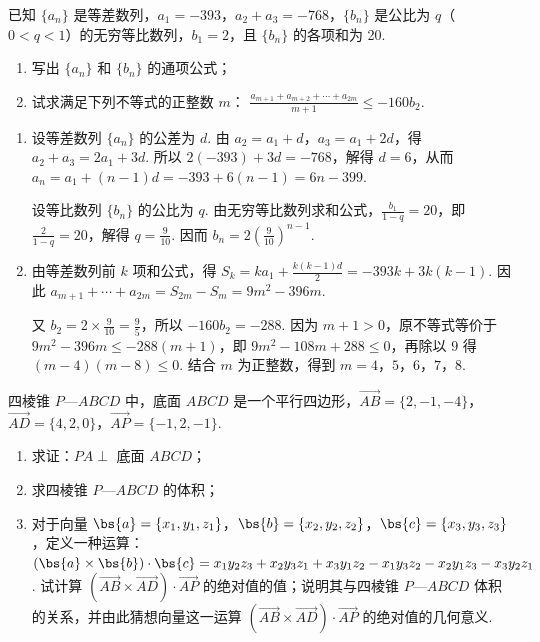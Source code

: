 \begin{problem}
已知 \(\{a_{n}\}\) 是等差数列，\(a_{1} = -393\)，\(a_{2} + a_{3} = -768\)，\(\{b_{n}\}\) 是公比为 \(q\)（\(0 < q < 1\)）的无穷等比数列，\(b_{1} = 2\)，且 \(\{b_{n}\}\) 的各项和为 20.

\begin{enumerate}
\item 写出 \(\{a_{n}\}\) 和 \(\{b_{n}\}\) 的通项公式；
\item 试求满足下列不等式的正整数 \(m\)： \(\displaystyle \frac{a_{m + 1} + a_{m + 2} + \cdots + a_{2m}}{m + 1} \leqslant -160b_{2}\).
\end{enumerate}
\end{problem}

\begin{solution}
\begin{enumerate}
\item 设等差数列 \(\{a_n\}\) 的公差为 \(d\). 由 \(a_2=a_1+d\)，\(a_3=a_1+2d\)，得
\(a_2+a_3=2a_1+3d\). 所以 \(2(-393)+3d=-768\)，解得 \(d=6\)，从而
\(a_n=a_1+(n-1)d=-393+6(n-1)=6n-399\).

设等比数列 \(\{b_n\}\) 的公比为 \(q\). 由无穷等比数列求和公式，\(\frac{b_1}{1-q}=20\)，即 \(\frac2{1-q}=20\)，解得 \(q=\frac9{10}\). 因而
\(b_n=2\left(\frac9{10}\right)^{n-1}\).

\item 由等差数列前 \(k\) 项和公式，得
\(S_k=ka_1+\frac{k(k-1)d}{2}=-393k+3k(k-1)\). 因此
\(a_{m+1}+\cdots+a_{2m}=S_{2m}-S_m=9m^2-396m\).

又 \(b_2=2\times\frac9{10}=\frac95\)，所以 \(-160b_2=-288\). 因为 \(m+1>0\)，原不等式等价于
\(9m^2-396m\leqslant-288(m+1)\)，即 \(9m^2-108m+288\leqslant0\)，再除以 \(9\) 得
\((m-4)(m-8)\leqslant0\). 结合 \(m\) 为正整数，得到 \(m=4\)，\(5\)，\(6\)，\(7\)，\(8\).
\end{enumerate}
\end{solution}

\begin{problem}
四棱锥 \(P\)—\(ABCD\) 中，底面 \(ABCD\) 是一个平行四边形，\(\overrightarrow{AB}=\{2,-1,-4\}\)，\(\overrightarrow{AD}=\{4,2,0\}\)，\(\overrightarrow{AP}=\{-1,2,-1\}\).

\begin{enumerate}
\item 求证：\(PA \perp\) 底面 \(ABCD\)；
\item 求四棱锥 \(P\)—\(ABCD\) 的体积；
\item 对于向量 \(\bs{a}=\{x_{1},y_{1},z_{1}\}\)，\(\bs{b}=\{x_{2},y_{2},z_{2}\}\)，\(\bs{c}=\{x_{3},y_{3},z_{3}\}\)，定义一种运算：\(\displaystyle (\bs{a} \times \bs{b}) \cdot \bs{c} = x_{1} y_{2} z_{3} + x_{2} y_{3} z_{1} + x_{3} y_{1} z_{2} - x_{1} y_{3} z_{2} - x_{2} y_{1} z_{3} - x_{3} y_{2} z_{1}\). 试计算 \( (\overrightarrow{AB}\times\overrightarrow{AD})\cdot\overrightarrow{AP} \) 的绝对值的值；说明其与四棱锥 \(P\)—\(ABCD\) 体积的关系，并由此猜想向量这一运算 \( (\overrightarrow{AB}\times\overrightarrow{AD})\cdot\overrightarrow{AP} \) 的绝对值的几何意义.
\end{enumerate}
\end{problem}

